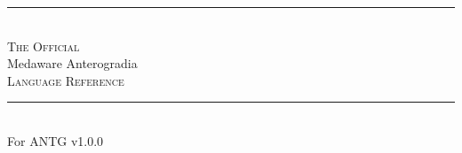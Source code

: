 \vspace*{\fill}
\begin{center}
	\rule{.5\textwidth}{0.1pt} \\[5mm]
	{\LARGE\textsc{The Official}}
	\\[8mm]
	{\Huge Medaware Anterogradia\texttrademark}\\[8mm]
	{\LARGE\textsc{Language Reference}} \\[5mm]
	\rule{.5\textwidth}{0.1pt} \\[10mm]
	\Large For ANTG v1.0.0
\end{center}
\vspace*{\fill}
\newpage
